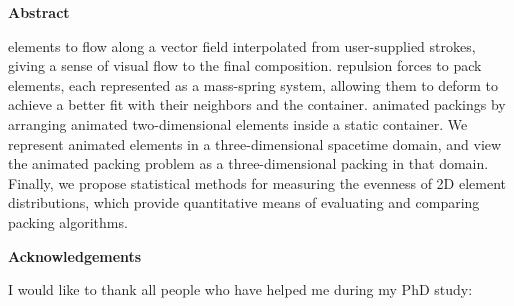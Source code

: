 

\cleardoublepage


{}
\begin{center}\textbf{Abstract}\end{center}

 elements to flow along a vector field interpolated
from user-supplied strokes, giving a sense of visual flow to the final composition.
 repulsion forces to pack
elements, each represented as a mass-spring system, allowing them to deform
to achieve a better fit with their neighbors and the container.
 animated packings
by arranging animated two-dimensional elements inside a static
container. We represent animated elements in a three-dimensional
spacetime domain, and view the animated packing problem as a
three-dimensional packing in that domain.
Finally, we propose statistical methods for measuring the evenness of
2D element distributions, which provide quantitative
means of evaluating and comparing packing algorithms.

\cleardoublepage


\begin{center}\textbf{Acknowledgements}\end{center}

I would like to thank all people who have helped me during my PhD study:


